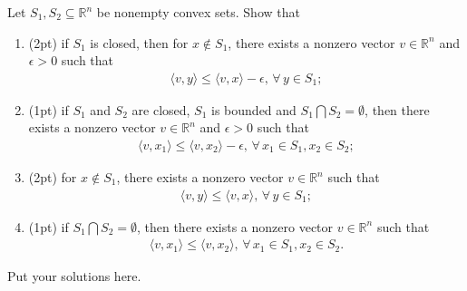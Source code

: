 \documentclass[11pt,letter,notitlepage]{article}
\begin{document}
\begin{exercise}
	Let $S_1, S_2\subseteq\mathbb{R}^n$ be nonempty convex sets.
	Show that
	\begin{enumerate}
		\item (2pt) if $S_1$ is closed, then for $x\notin S_1$, there exists a nonzero vector $v\in\mathbb{R}^n$ and $\epsilon>0$ such that
		\begin{align*}
		\langle v,y\rangle\leq\langle v, x\rangle-\epsilon,\,\forall\,y\in S_1;
		\end{align*}
		
		\item (1pt) if $S_1$ and $S_2$ are closed, $S_1$ is bounded and $S_1\bigcap S_2=\emptyset$, then there exists a nonzero vector $v\in\mathbb{R}^n$ and $\epsilon>0$ such that
		\begin{align*}
			\langle v,x_1\rangle\leq\langle v,x_2\rangle-\epsilon,\,\forall\,x_1\in S_1, x_2\in S_2;
		\end{align*}
		
		\item (2pt) for $x\notin S_1$, there exists a nonzero vector $v\in\mathbb{R}^n$ such that
		\begin{align*}
		\langle v,y\rangle\leq\langle v, x\rangle,\,\forall\,y\in S_1;
		\end{align*}
		
		\item (1pt) if $S_1\bigcap S_2=\emptyset$, then there exists a nonzero vector $v\in\mathbb{R}^n$ such that
		\begin{align*}
		\langle v,x_1\rangle\leq\langle v,x_2\rangle,\,\forall\,x_1\in S_1, x_2\in S_2.
		\end{align*}
	\end{enumerate}
	
\end{exercise}

\begin{solution}
	Put your solutions here. 
\end{solution}



\end{document}
